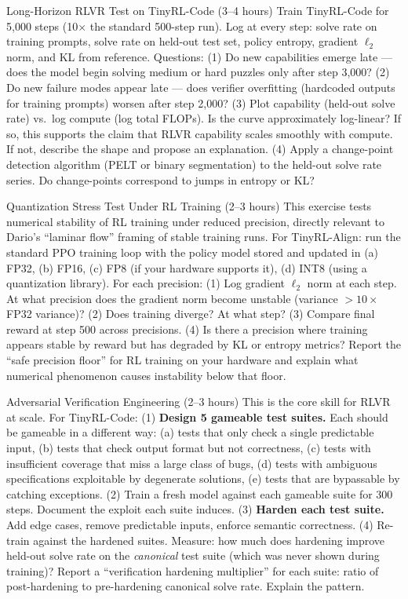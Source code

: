 \begin{exercise}{Long-Horizon RLVR Test on TinyRL-Code (3--4 hours)}
Train TinyRL-Code for 5{,}000 steps (10$\times$ the standard 500-step run). Log at every step: solve rate on training prompts, solve rate on held-out test set, policy entropy, gradient $\ell_2$ norm, and KL from reference. Questions: (1) Do new capabilities emerge late --- does the model begin solving medium or hard puzzles only after step 3{,}000? (2) Do new failure modes appear late --- does verifier overfitting (hardcoded outputs for training prompts) worsen after step 2{,}000? (3) Plot capability (held-out solve rate) vs.\ log compute (log total FLOPs). Is the curve approximately log-linear? If so, this supports the claim that RLVR capability scales smoothly with compute. If not, describe the shape and propose an explanation. (4) Apply a change-point detection algorithm (PELT or binary segmentation) to the held-out solve rate series. Do change-points correspond to jumps in entropy or KL?
\end{exercise}

\begin{exercise}{Quantization Stress Test Under RL Training (2--3 hours)}
This exercise tests numerical stability of RL training under reduced precision, directly relevant to Dario's ``laminar flow'' framing of stable training runs. For TinyRL-Align: run the standard PPO training loop with the policy model stored and updated in (a) FP32, (b) FP16, (c) FP8 (if your hardware supports it), (d) INT8 (using a quantization library). For each precision: (1) Log gradient $\ell_2$ norm at each step. At what precision does the gradient norm become unstable (variance $>10\times$ FP32 variance)? (2) Does training diverge? At what step? (3) Compare final reward at step 500 across precisions. (4) Is there a precision where training appears stable by reward but has degraded by KL or entropy metrics? Report the ``safe precision floor'' for RL training on your hardware and explain what numerical phenomenon causes instability below that floor.
\end{exercise}

\begin{exercise}{Adversarial Verification Engineering (2--3 hours)}
This is the core skill for RLVR at scale. For TinyRL-Code: (1) \textbf{Design 5 gameable test suites.} Each should be gameable in a different way: (a) tests that only check a single predictable input, (b) tests that check output format but not correctness, (c) tests with insufficient coverage that miss a large class of bugs, (d) tests with ambiguous specifications exploitable by degenerate solutions, (e) tests that are bypassable by catching exceptions. (2) Train a fresh model against each gameable suite for 300 steps. Document the exploit each suite induces. (3) \textbf{Harden each test suite.} Add edge cases, remove predictable inputs, enforce semantic correctness. (4) Re-train against the hardened suites. Measure: how much does hardening improve held-out solve rate on the \textit{canonical} test suite (which was never shown during training)? Report a ``verification hardening multiplier'' for each suite: ratio of post-hardening to pre-hardening canonical solve rate. Explain the pattern.
\end{exercise}

